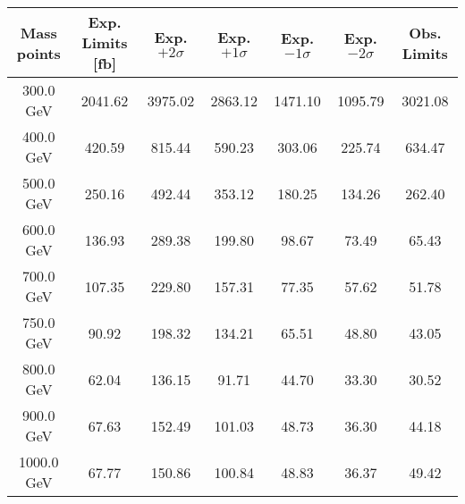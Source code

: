 
\begin{table}
\begin{center}
\begin{tabular}{c|cccccc}
\hline
\hline
Mass points & Exp. Limits [fb] & Exp. $+2\sigma$ & Exp. $+1\sigma$ &  Exp. $-1\sigma$  &  Exp. $-2\sigma$ & Obs. Limits \\
\hline
300.0 GeV  &  2041.62  & 3975.02  & 2863.12  & 1471.10  & 1095.79   & 3021.08\\
400.0 GeV  &  420.59  & 815.44  & 590.23  & 303.06  & 225.74   & 634.47\\
500.0 GeV  &  250.16  & 492.44  & 353.12  & 180.25  & 134.26   & 262.40\\
600.0 GeV  &  136.93  & 289.38  & 199.80  & 98.67  & 73.49   & 65.43\\
700.0 GeV  &  107.35  & 229.80  & 157.31  & 77.35  & 57.62   & 51.78\\
750.0 GeV  &  90.92  & 198.32  & 134.21  & 65.51  & 48.80   & 43.05\\
800.0 GeV  &  62.04  & 136.15  & 91.71  & 44.70  & 33.30   & 30.52\\
900.0 GeV  &  67.63  & 152.49  & 101.03  & 48.73  & 36.30   & 44.18\\
1000.0 GeV  &  67.77  & 150.86  & 100.84  & 48.83  & 36.37   & 49.42\\

\hline
\hline
\end{tabular}
\end{center}
\end{table}

